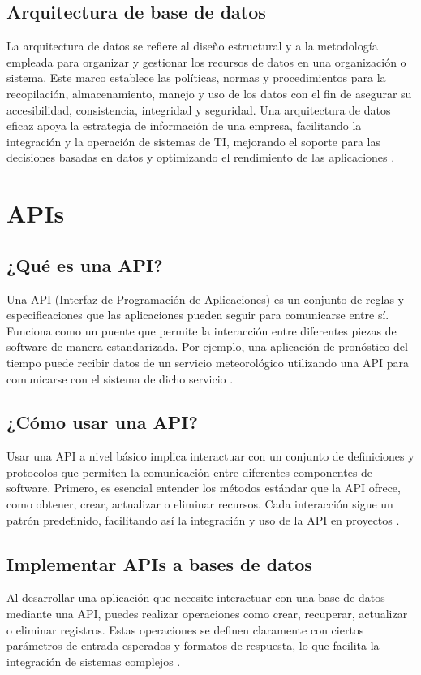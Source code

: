 \subsection{Arquitectura de base de datos}
La arquitectura de datos se refiere al diseño estructural y a la metodología empleada para organizar y gestionar los recursos de datos en una organización o sistema. Este marco establece las políticas, normas y procedimientos para la recopilación, almacenamiento, manejo y uso de los datos con el fin de asegurar su accesibilidad, consistencia, integridad y seguridad. Una arquitectura de datos eficaz apoya la estrategia de información de una empresa, facilitando la integración y la operación de sistemas de TI, mejorando el soporte para las decisiones basadas en datos y optimizando el rendimiento de las aplicaciones \cite{ArquitecturaDatos}.

\section{APIs}
\subsection{¿Qué es una API?}
Una API (Interfaz de Programación de Aplicaciones) es un conjunto de reglas y especificaciones que las aplicaciones pueden seguir para comunicarse entre sí. Funciona como un puente que permite la interacción entre diferentes piezas de software de manera estandarizada. Por ejemplo, una aplicación de pronóstico del tiempo puede recibir datos de un servicio meteorológico utilizando una API para comunicarse con el sistema de dicho servicio \cite{API}.

\subsection{¿Cómo usar una API?}
Usar una API a nivel básico implica interactuar con un conjunto de definiciones y protocolos que permiten la comunicación entre diferentes componentes de software. Primero, es esencial entender los métodos estándar que la API ofrece, como obtener, crear, actualizar o eliminar recursos. Cada interacción sigue un patrón predefinido, facilitando así la integración y uso de la API en proyectos \cite{UsoAPI}.

\subsection{Implementar APIs a bases de datos}
Al desarrollar una aplicación que necesite interactuar con una base de datos mediante una API, puedes realizar operaciones como crear, recuperar, actualizar o eliminar registros. Estas operaciones se definen claramente con ciertos parámetros de entrada esperados y formatos de respuesta, lo que facilita la integración de sistemas complejos \cite{ImplementarAPI}.

